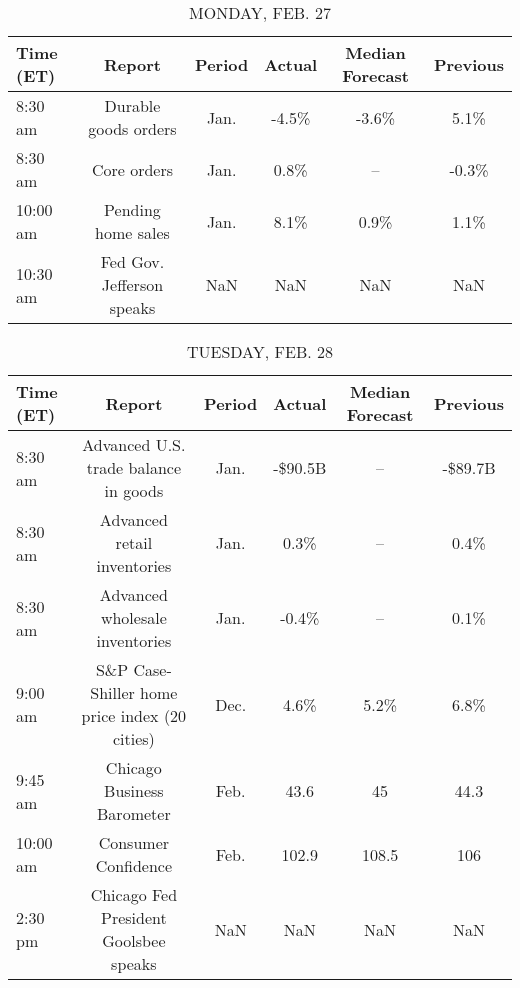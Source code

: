 \documentclass{article}%
\begin{document}
%
\normalsize%


\begin{table}[htbp]%
\caption{MONDAY, FEB. 27}%
\centering%
\begin{adjustbox}{width=1\textwidth}%
\begin{tabular}{lccccc}
\toprule
Time (ET) &                    Report & Period & Actual & Median Forecast & Previous \\
\midrule
  8:30 am &      Durable goods orders &   Jan. &  -4.5\% &           -3.6\% &     5.1\% \\
  8:30 am &               Core orders &   Jan. &   0.8\% &              -- &    -0.3\% \\
 10:00 am &        Pending home sales &   Jan. &   8.1\% &            0.9\% &     1.1\% \\
 10:30 am & Fed Gov. Jefferson speaks &    NaN &    NaN &             NaN &      NaN \\
\bottomrule
\end{tabular}
%
\end{adjustbox}%
\end{table}

%


\begin{table}[htbp]%
\caption{TUESDAY, FEB. 28}%
\centering%
\begin{adjustbox}{width=1\textwidth}%
\begin{tabular}{lccccc}
\toprule
Time (ET) &                                        Report & Period &  Actual & Median Forecast & Previous \\
\midrule
  8:30 am &          Advanced U.S. trade balance in goods &   Jan. & -\$90.5B &              -- &  -\$89.7B \\
  8:30 am &                   Advanced retail inventories &   Jan. &    0.3\% &              -- &     0.4\% \\
  8:30 am &                Advanced wholesale inventories &   Jan. &   -0.4\% &              -- &     0.1\% \\
  9:00 am & S\&P Case-Shiller home price index (20 cities) &   Dec. &    4.6\% &            5.2\% &     6.8\% \\
  9:45 am &                    Chicago Business Barometer &   Feb. &    43.6 &              45 &     44.3 \\
 10:00 am &                           Consumer Confidence &   Feb. &   102.9 &           108.5 &      106 \\
  2:30 pm &         Chicago Fed President Goolsbee speaks &    NaN &     NaN &             NaN &      NaN \\
\bottomrule
\end{tabular}
%
\end{adjustbox}%
\end{table}
\end{document}
